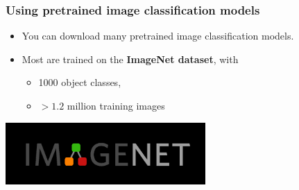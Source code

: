 \documentclass{beamer}
\begin{document}
    \begin{frame}
        \frametitle{Using pretrained image classification models}

        \bigskip
\begin{itemize}
    \setlength\itemsep{1em}
    \item You can download many pretrained image classification models.
    \item Most are trained on the \textbf{ImageNet dataset}, with
    
    \bigskip
    \begin{itemize}
        \setlength\itemsep{1em}
        \item 1000 object classes,
        \item $> 1.2$ million training images
    \end{itemize}
    \end{itemize}

    \bigskip
    \begin{center}
        \includegraphics[width=3in]{imagenet.png}
    \end{center}        
    
    \end{frame}
\end{document}
